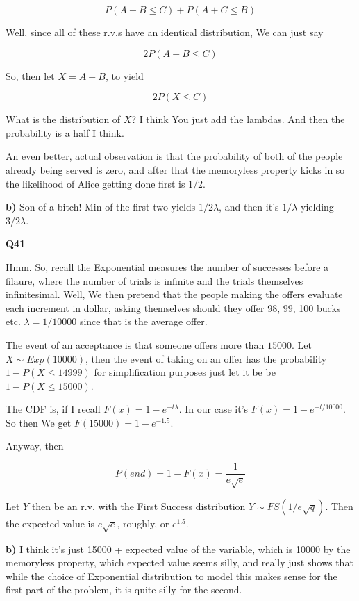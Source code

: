 \documentclass{article}
\begin{document}
			\[ P(A + B \le C) + P(A+C \le B) \]
			
			Well, since all of these r.v.s have an identical distribution, We can just say
			
			\[ 2P(A+B\le C) \]
		
			So, then let $X = A+B$, to yield
			
			\[ 2P(X\le C) \]
		
			What is the distribution of $X$? I think You just add the lambdas. And then the probability is a half I think.
			
			An even better, actual observation is that the probability of both of the people already being served is zero, and after that the memoryless property kicks in so the likelihood of Alice getting done first is 1/2.
			
			\textbf{b)} Son of a bitch! Min of the first two yields $1/2\lambda$, and then it's $1/\lambda$ yielding $3/2\lambda$.
		
		\textbf{Q41}
		
			Hmm. So, recall the Exponential measures the number of successes before a filaure, where the number of trials is infinite and the trials themselves infinitesimal. Well, We then pretend that the people making the offers evaluate each increment in dollar, asking themselves should they offer 98, 99, 100 bucks etc. $\lambda = 1/10000$ since that is the average offer.
			
			The event of an acceptance is that someone offers more than $15000$. Let $X\sim Exp(10000)$, then the event of taking on an offer has the probability $1 - P(X\le 14999)$ for simplification purposes just let it be be $1-P(X\le 15000)$.
			
			The CDF is, if I recall $F(x) = 1 - e^{-t\lambda}$. In our case it's $F(x) = 1 - e^{-t/10000}$. So then We get $F(15000) = 1-e^{-1.5}$.
			
			Anyway, then 
			
			\[ P(end) = 1 - F(x) = \frac{1}{e\sqrt{e}} \]
			
			Let $Y$ then be an r.v. with the First Success distribution $Y\sim FS(1/e\sqrt{q})$.	Then the expected value is $e\sqrt{e}$, roughly, or $e^{1.5}$.
			
			\textbf{b)} I think it's just 15000 + expected value of the variable, which is 10000 by the memoryless property, which expected value seems silly, and really just shows that while the choice of Exponential distribution to model this makes sense for the first part of the problem, it is quite silly for the second.
			
\end{document}
